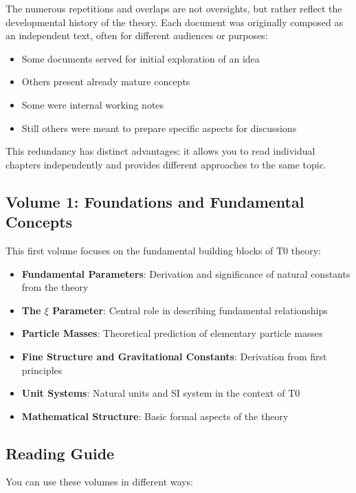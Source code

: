 The numerous repetitions and overlaps are not oversights, but rather reflect the developmental history of the theory. Each document was originally composed as an independent text, often for different audiences or purposes:

\begin{itemize}
\item Some documents served for initial exploration of an idea
\item Others present already mature concepts
\item Some were internal working notes
\item Still others were meant to prepare specific aspects for discussions
\end{itemize}

This redundancy has distinct advantages: it allows you to read individual chapters independently and provides different approaches to the same topic.

\subsection*{Volume 1: Foundations and Fundamental Concepts}

This first volume focuses on the fundamental building blocks of T0 theory:

\begin{itemize}
\item \textbf{Fundamental Parameters}: Derivation and significance of natural constants from the theory
\item \textbf{The $\xi$ Parameter}: Central role in describing fundamental relationships
\item \textbf{Particle Masses}: Theoretical prediction of elementary particle masses
\item \textbf{Fine Structure and Gravitational Constants}: Derivation from first principles
\item \textbf{Unit Systems}: Natural units and SI system in the context of T0
\item \textbf{Mathematical Structure}: Basic formal aspects of the theory
\end{itemize}

\subsection*{Reading Guide}

You can use these volumes in different ways:

